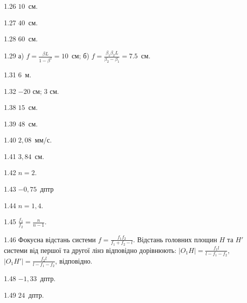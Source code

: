\begin{Solution}{1.{26}}
	$10$~см.
\end{Solution}
\begin{Solution}{1.{27}}
	$40$~см.
\end{Solution}
\begin{Solution}{1.{28}}
	$60$~см.
\end{Solution}
\begin{Solution}{1.{29}}
	а) $f = \frac{\beta L}{1 - \beta^2} = 10$~см; б) $f = \frac{\beta_1\beta_2 L}{\beta_2 - \beta_1} = 7.5$~см.
\end{Solution}
\begin{Solution}{1.{31}}
	$6$~м.
\end{Solution}
\begin{Solution}{1.{32}}
	$-20$ см; $3$ см.
\end{Solution}
\begin{Solution}{1.{38}}
	$15$~см.
\end{Solution}
\begin{Solution}{1.{39}}
	$48$~см.
\end{Solution}
\begin{Solution}{1.{40}}
	$2,08$~мм/с.
\end{Solution}
\begin{Solution}{1.{41}}
	$3,84$~см.
\end{Solution}
\begin{Solution}{1.{42}}
	$n = 2$.
\end{Solution}
\begin{Solution}{1.{43}}
	$-0,75$~дптр
\end{Solution}
\begin{Solution}{1.{44}}
	$n = 1,4$.
\end{Solution}
\begin{Solution}{1.{45}}
	$\frac{f_1}{f_2} = \frac{n}{n - 1}$.
\end{Solution}
\begin{Solution}{1.{46}}
	Фокусна відстань системи $f = \frac{f_1f_2}{f_1 + f_2 - l}$.  Відстань головних площин $H$ та $H'$ системи від першої та другої лінз відповідно дорівнюють: $|O_1H| = \frac{f_1l}{l - f_1 - f_2}$, $|O_1H'| = \frac{f_2l}{l - f_1 - f_2}$, відповідно.
\end{Solution}
\begin{Solution}{1.{48}}
	$-1,33$~дптр.
\end{Solution}
\begin{Solution}{1.{49}}
	$24$~дптр.
\end{Solution}
